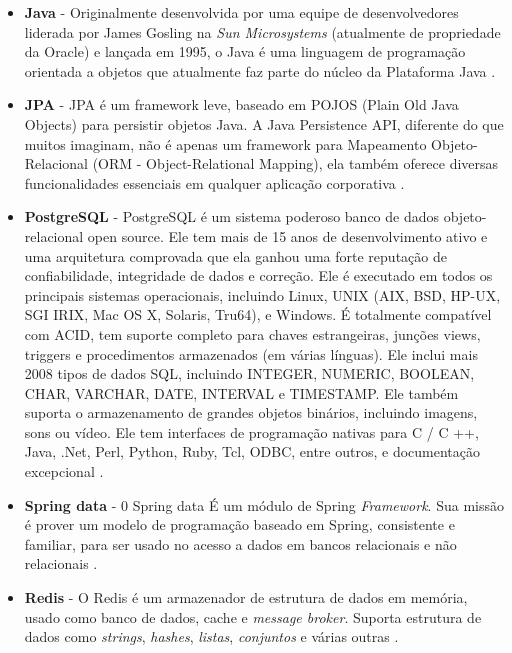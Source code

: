 \documentclass[a4paper,12pt]{monografia}
\begin{document}
\begin{itemize}
\item \textbf{Java} - Originalmente desenvolvida por uma equipe de desenvolvedores liderada por James Gosling na \textit{Sun Microsystems} (atualmente de propriedade da Oracle) e lançada em 1995, o Java é uma linguagem de programação orientada a objetos que atualmente faz parte do núcleo da Plataforma Java \cite{java}.

\item \textbf{JPA} - JPA é um framework leve, baseado em POJOS (Plain Old Java Objects) para persistir objetos Java. A Java Persistence API, diferente do que muitos imaginam, não é apenas um framework para Mapeamento Objeto-Relacional (ORM - Object-Relational Mapping), ela também oferece diversas funcionalidades essenciais em qualquer aplicação corporativa \cite{medeiros}.

\item \textbf{PostgreSQL} - PostgreSQL é um sistema poderoso banco de dados objeto-relacional open source. Ele tem mais de 15 anos de desenvolvimento ativo e uma arquitetura comprovada que ela ganhou uma forte reputação de confiabilidade, integridade de dados e correção. Ele é executado em todos os principais sistemas operacionais, incluindo Linux, UNIX (AIX, BSD, HP-UX, SGI IRIX, Mac OS X, Solaris, Tru64), e Windows. É totalmente compatível com ACID, tem suporte completo para chaves estrangeiras, junções views, triggers e procedimentos armazenados (em várias línguas). Ele inclui mais 2008 tipos de dados SQL, incluindo INTEGER, NUMERIC, BOOLEAN, CHAR, VARCHAR, DATE, INTERVAL e TIMESTAMP. Ele também suporta o armazenamento de grandes objetos binários, incluindo imagens, sons ou vídeo. Ele tem interfaces de programação nativas para C / C ++, Java, .Net, Perl, Python, Ruby, Tcl, ODBC, entre outros, e documentação excepcional \cite{postgresql}.

\item \textbf{Spring data} - 0 Spring data É um módulo de Spring \textit{Framework}. Sua missão é prover um modelo de programação baseado em Spring, consistente e familiar, para ser usado no acesso a dados em bancos relacionais e não relacionais \cite{springdata}.

\item \textbf{Redis} - O Redis é um armazenador de estrutura de dados em memória, usado como banco de dados, cache e \textit{message broker}. Suporta estrutura de dados como \textit{strings}, \textit{hashes}, \textit{listas}, \textit{conjuntos} e várias outras \cite{redis}.

\end{itemize}
\end{document}
